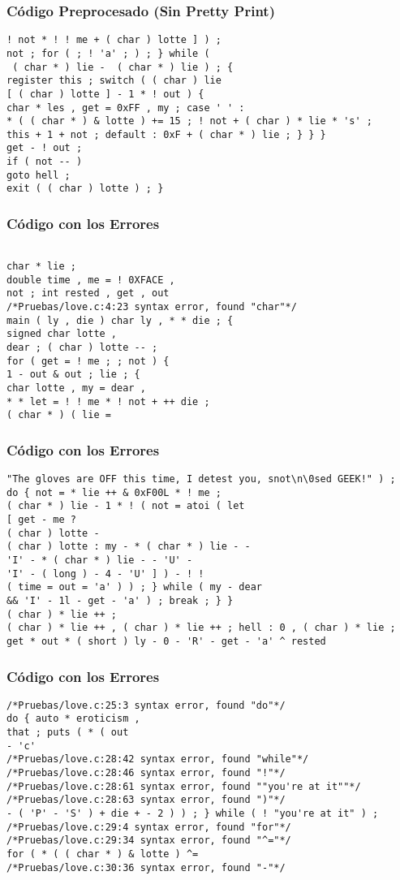 \documentclass{beamer}
\begin{document}
\begin{frame}[fragile]
\frametitle{C\'odigo Preprocesado (Sin Pretty Print)}
\begin{lstlisting}[style=CStyle]
! not * ! ! me + ( char ) lotte ] ) ; 
not ; for ( ; ! 'a' ; ) ; } while ( 
 ( char * ) lie -  ( char * ) lie ) ; { 
register this ; switch ( ( char ) lie 
[ ( char ) lotte ] - 1 * ! out ) { 
char * les , get = 0xFF , my ; case ' ' : 
* ( ( char * ) & lotte ) += 15 ; ! not + ( char ) * lie * 's' ; 
this + 1 + not ; default : 0xF + ( char * ) lie ; } } } 
get - ! out ; 
if ( not -- ) 
goto hell ; 
exit ( ( char ) lotte ) ; } \end{lstlisting}
\end{frame}
\begin{frame}[fragile]
\frametitle{C\'odigo con los Errores}
\begin{lstlisting}[style=CStyle]

char * lie ; 
double time , me = ! 0XFACE , 
not ; int rested , get , out 
/*Pruebas/love.c:4:23 syntax error, found "char"*/
main ( ly , die ) char ly , * * die ; { 
signed char lotte , 
dear ; ( char ) lotte -- ; 
for ( get = ! me ; ; not ) { 
1 - out & out ; lie ; { 
char lotte , my = dear , 
* * let = ! ! me * ! not + ++ die ; 
( char * ) ( lie = 
\end{lstlisting}
\end{frame}
\begin{frame}[fragile]
\frametitle{C\'odigo con los Errores}
\begin{lstlisting}[style=CStyle]
"The gloves are OFF this time, I detest you, snot\n\0sed GEEK!" ) ; 
do { not = * lie ++ & 0xF00L * ! me ; 
( char * ) lie - 1 * ! ( not = atoi ( let 
[ get - me ? 
( char ) lotte - 
( char ) lotte : my - * ( char * ) lie - - 
'I' - * ( char * ) lie - - 'U' - 
'I' - ( long ) - 4 - 'U' ] ) - ! ! 
( time = out = 'a' ) ) ; } while ( my - dear 
&& 'I' - 1l - get - 'a' ) ; break ; } } 
( char ) * lie ++ ; 
( char ) * lie ++ , ( char ) * lie ++ ; hell : 0 , ( char ) * lie ; 
get * out * ( short ) ly - 0 - 'R' - get - 'a' ^ rested 
\end{lstlisting}
\end{frame}
\begin{frame}[fragile]
\frametitle{C\'odigo con los Errores}
\begin{lstlisting}[style=CStyle]
/*Pruebas/love.c:25:3 syntax error, found "do"*/
do { auto * eroticism , 
that ; puts ( * ( out 
- 'c' 
/*Pruebas/love.c:28:42 syntax error, found "while"*/
/*Pruebas/love.c:28:46 syntax error, found "!"*/
/*Pruebas/love.c:28:61 syntax error, found ""you're at it""*/
/*Pruebas/love.c:28:63 syntax error, found ")"*/
- ( 'P' - 'S' ) + die + - 2 ) ) ; } while ( ! "you're at it" ) ; 
/*Pruebas/love.c:29:4 syntax error, found "for"*/
/*Pruebas/love.c:29:34 syntax error, found "^="*/
for ( * ( ( char * ) & lotte ) ^= 
/*Pruebas/love.c:30:36 syntax error, found "-"*/
\end{lstlisting}
\end{frame}
\end{document}
